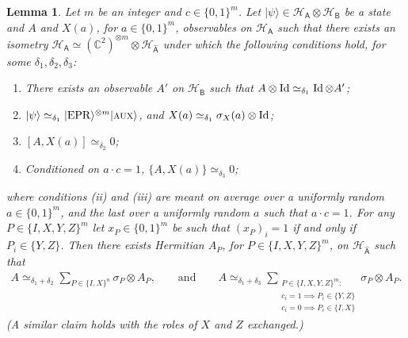\documentclass[11pt]{article}
\numberwithin{equation}{section}
\newtheorem{lemma}[theorem]{Lemma}
\theoremstyle{definition}
\theoremstyle{plain}
\newcommand{\C}{\mathbb C}
\newcommand{\ket}[1]{|#1\rangle}
\newcommand{\Id}{\ensuremath{\mathop{\rm Id}\nolimits}}
\newcommand{\reg}[1]{{\textsf{#1}}}
\newcommand{\mH}{\mathcal{H}}
\newcommand{\EPR}{{\rm EPR}}
\newcommand{\aux}{\textsc {aux}}
\begin{document}
\begin{lemma}\label{lem:pauli-c-n}
Let $m$ be an integer and $c\in\{0,1\}^m$. Let $\ket{\psi} \in \mH_{\reg{A}} \otimes \mH_{\reg{B}}$ be a state and $A$ and $X(a)$, for $a\in\{0,1\}^m$, observables on $\mH_{\reg{A}}$ such that there exists an isometry $\mH_{\reg{A}} \simeq (\C^2)^{\otimes m}\otimes \mH_{\hat{\reg{A}}}$ under which the following conditions hold, for some $\delta_1,\delta_2,\delta_3$:
\begin{enumerate}
\item[(i)] There exists an observable $A'$ on $\mH_\reg{B}$ such that $A\otimes \Id \simeq_{\delta_1} \Id \otimes A'$;
\item[(ii)] $\ket{\psi} \simeq_{\delta_1} \ket{\EPR}^{\otimes m}\ket{\aux}$, and $X(a)\simeq_{\delta_1} \sigma_X(a) \otimes \Id$;
\item[(iii)] $[A,X(a)]\simeq_{\delta_2} 0$;
\item[(iv)] Conditioned on $a\cdot c=1$, $\{A,X(a)\} \simeq_{\delta_3} 0$;
\end{enumerate}
where conditions (ii) and (iii) are meant on average over a uniformly random
  $a\in\{0,1\}^m$, and the last over a uniformly random $a$ such that $a\cdot c
  =1$. For any $P\in\{I,X,Y,Z\}^m$ let $x_P \in\{0,1\}^m$ be such that $(x_P)_i=1$ if and only if $P_i\in\{Y,Z\}$.
Then there exists Hermitian $A_P$, for $P\in\{I,X,Y,Z\}^m$, on $\mH_{\hat{\reg{A}}}$ such that 
\begin{align}
A \simeq_{\delta_1+\delta_2} \sum_{P\in\{I,X\}^n} \sigma_P \otimes A_P,\qquad\text{and}\qquad A \simeq_{\delta_1+\delta_3} \sum_{\substack{P\in\{I,X,Y,Z\}^m:\\ c_i=1 \implies P_i \in \{Y,Z\}\\  c_i=0 \implies P_i \in \{I,X\}}} \sigma_P \otimes A_P.\label{eq:la6}
\end{align}
 (A similar claim holds with the roles of $X$ and $Z$ exchanged.)
\end{lemma}
\end{document}

